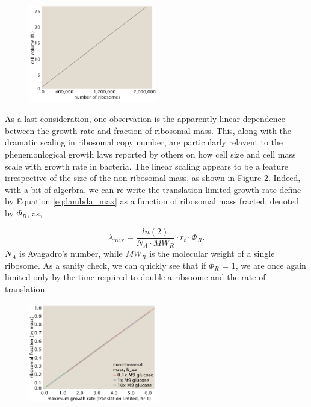 \documentclass[11pt, letterpaper]{article}
\begin{document}
\begin{figure}[H]
		\centering
    \includegraphics[width=0.5\textwidth]{../../code/figures/SI/estimates_translation_volume.pdf}
  \caption{}
  \label{fig:estimates_translation_volume}
\end{figure}

As a last consideration, one observation is the apparently linear dependence
between the growth rate and fraction of ribosomal mass. This, along with the
dramatic scaling in ribosomal copy number, are particularly relavent to the
phenemonlogical growth laws reported by others on how cell size and cell mass
scale with growth rate in bacteria. The linear scaling appears to be a feature
irrespective of the size of the non-ribosomal mass, as shown in Figure
\ref{fig:estimates_translation_ribo_frac}. Indeed, with a bit of algerbra, we
can re-write the translation-limited growth rate define by Equation \ref{eq:lambda_max}
as a function of ribosomal mass fracted, denoted by $\Phi_R$, as,

\begin{equation}
\lambda_{\text{max}} =  \frac{ln(2)} {N_A \cdot MW_R} \cdot r_t \cdot \Phi_R.
\end{equation}
$N_A$ is Avagadro's number, while $MW_R$ is the molecular weight of a single ribosome.
As a sanity check, we can quickly see that if $\Phi_R$ = 1, we are once again limited
only by the time required to double a ribsoome and the rate of translation.

\begin{figure}[H]
		\centering
    \includegraphics[width=0.5\textwidth]{../../code/figures/SI/estimates_translation_ribo_frac.pdf}
  \caption{}
  \label{fig:estimates_translation_ribo_frac}
\end{figure}
\end{document}
